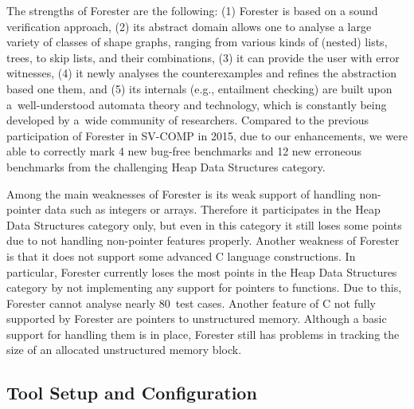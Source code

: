 The strengths of Forester are the following: (1) Forester is based on a sound
verification approach, (2) its abstract domain allows one to analyse a large
variety of classes of shape graphs, ranging from various kinds of (nested)
lists, trees, to skip lists, and their combinations, (3) it can provide the user
with error witnesses, (4) it newly analyses the counterexamples and refines the
abstraction based one them, and (5) its internals (e.g., entailment checking)
are built upon a~well-understood automata theory and technology, which is
constantly being developed by a~wide community of researchers.
Compared to the previous participation of Forester in SV-COMP in 2015, due to
our enhancements, we were able to correctly mark 4 new bug-free benchmarks and
12 new erroneous benchmarks from the challenging Heap Data Structures category.

Among the main weaknesses of Forester is its weak support of handling
non-pointer data such as integers or arrays. Therefore it participates in the
Heap Data Structures category only, but even in this category it still loses
some points due to not handling non-pointer features %
properly. Another weakness of Forester is that it does
not support some advanced C language constructions.
In particular, Forester currently loses
the most points in the Heap Data Structures category by not implementing any
support for pointers to functions. Due to this, Forester cannot analyse nearly
80~test cases.
Another feature of C not fully supported by Forester are pointers to
unstructured memory.
Although a basic support for handling them is in place, Forester still has
problems in tracking the size of an allocated unstructured memory block.


\subsection{Tool Setup and
Configuration}\label{sec:tool_setup}

